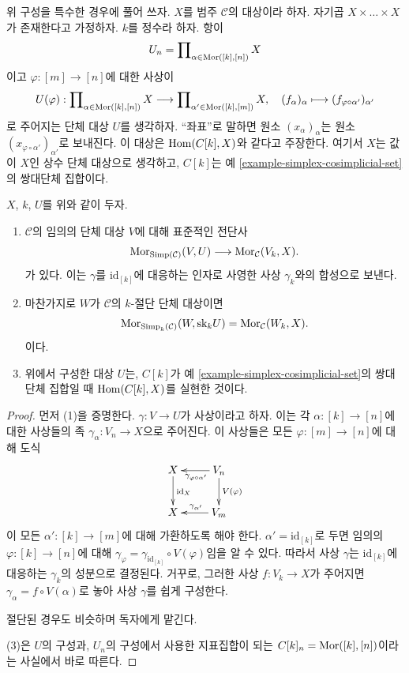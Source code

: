 \medskip\noindent
위 구성을 특수한 경우에 풀어 쓰자.
$X$를 범주 $\mathcal{C}$의 대상이라 하자.
자기곱 $X \times \ldots \times X$가 존재한다고 가정하자.
$k$를 정수라 하자. 항이
$$
U_n = \prod\nolimits_{\alpha \in \mathop{\mathrm{Mor}}\nolimits([k], [n])} X
$$
이고 $\varphi : [m] \to [n]$에 대한 사상이
$$
U(\varphi) :
\prod\nolimits_{\alpha \in \mathop{\mathrm{Mor}}\nolimits([k], [n])} X
\longrightarrow
\prod\nolimits_{\alpha' \in \mathop{\mathrm{Mor}}\nolimits([k], [m])} X, \quad
(f_{\alpha})_{\alpha} \longmapsto
(f_{\varphi \circ \alpha'})_{\alpha'}
$$
로 주어지는 단체 대상 $U$를 생각하자.
``좌표''로 말하면 원소 $(x_\alpha)_\alpha$는 원소
$(x_{\varphi \circ \alpha'})_{\alpha'}$로 보내진다.
이 대상은 $\mathop{\mathrm{Hom}}\nolimits(C[k], X)$와 같다고 주장한다.
여기서 $X$는 값이 $X$인 상수 단체 대상으로 생각하고,
$C[k]$는 예 \ref{example-simplex-cosimplicial-set}의 쌍대단체 집합이다.

\begin{lemma}
\label{lemma-morphism-into-product}
$X$, $k$, $U$를 위와 같이 두자.
\begin{enumerate}
\item $\mathcal{C}$의 임의의 단체 대상 $V$에 대해 표준적인 전단사
$$
\mathop{\mathrm{Mor}}\nolimits_{\text{Simp}(\mathcal{C})}(V, U)
\longrightarrow
\mathop{\mathrm{Mor}}\nolimits_\mathcal{C}(V_k, X).
$$
가 있다. 이는 $\gamma$를 $\text{id}_{[k]}$에 대응하는 인자로 사영한
사상 $\gamma_k$와의 합성으로 보낸다.
\item 마찬가지로 $W$가 $\mathcal{C}$의 $k$-절단 단체 대상이면
$$
\mathop{\mathrm{Mor}}\nolimits_{\text{Simp}_k(\mathcal{C})}(W, \text{sk}_k U)
=
\mathop{\mathrm{Mor}}\nolimits_\mathcal{C}(W_k, X).
$$
이다.
\item 위에서 구성한 대상 $U$는, $C[k]$가 예
\ref{example-simplex-cosimplicial-set}의 쌍대단체 집합일 때
$\mathop{\mathrm{Hom}}\nolimits(C[k], X)$를 실현한 것이다.
\end{enumerate}
\end{lemma}

\begin{proof}
먼저 (1)을 증명한다.
$\gamma : V \to U$가 사상이라고 하자.
이는 각 $\alpha : [k] \to [n]$에 대한 사상들의 족
$\gamma_{\alpha} : V_n \to X$으로 주어진다.
이 사상들은 모든 $\varphi : [m] \to [n]$에 대해 도식
$$
\xymatrix{
X \ar[d]^{\text{id}_X} &
V_n \ar[d]^{V(\varphi)}
\ar[l]^{\gamma_{\varphi \circ \alpha'}} \\
X &
V_m \ar[l]_{\gamma_{\alpha'}}
}
$$
이 모든 $\alpha' : [k] \to [m]$에 대해 가환하도록 해야 한다.
$\alpha' = \text{id}_{[k]}$로 두면 임의의
$\varphi : [k] \to [n]$에 대해
$\gamma_\varphi = \gamma_{\text{id}_{[k]}} \circ V(\varphi)$임을 알 수 있다.
따라서 사상 $\gamma$는 $\text{id}_{[k]}$에 대응하는
$\gamma_k$의 성분으로 결정된다. 거꾸로, 그러한 사상
$f : V_k \to X$가 주어지면
$\gamma_\alpha = f \circ V(\alpha)$로 놓아 사상 $\gamma$를 쉽게 구성한다.

\medskip\noindent
절단된 경우도 비슷하며 독자에게 맡긴다.

\medskip\noindent
(3)은 $U$의 구성과, $U_n$의 구성에서 사용한 지표집합이 되는
$C[k]_n = \mathop{\mathrm{Mor}}\nolimits([k], [n])$이라는 사실에서 바로 따른다.
\end{proof}




